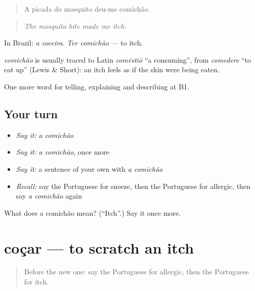 \begin{quote}
A picada do mosquito deu-me comichão.
\end{quote}

\begin{quote}
\emph{The mosquito bite made me itch.}
\end{quote}

In Brazil: \emph{a coceira}. \emph{Ter comichão} — to itch.

\begin{cousinweb}
\emph{comichão} is usually traced to Latin \emph{comēstiō} \textquotedblleft{}a consuming\textquotedblright{}, from \emph{comedere} \textquotedblleft{}to eat up\textquotedblright{} (Lewis \& Short): an itch feels as if the skin were being eaten.
\end{cousinweb}

\begin{grammarlens}[title={What you've built}]
One more word for telling, explaining and describing at B1.
\end{grammarlens}

\subsection*{Your turn}
\begin{itemize}
\raggedright
  \item \emph{Say it:} \emph{a comichão}
  \item \emph{Say it:} \emph{a comichão}, once more
  \item \emph{Say it:} a sentence of your own with \emph{a comichão}
  \item \emph{Recall:} say the Portuguese for sneeze, then the Portuguese for allergic, then say \emph{a comichão} again
\end{itemize}

\begin{tcolorbox}[breakable,colback=teal!4,colframe=teal!35!black,title={Before you move on}]
What does a comichão mean? (\textquotedblleft{}Itch\textquotedblright{}.) Say it once more.
\end{tcolorbox}
\section[coçar]{coçar — to scratch an itch}

\label{lesson:PT-C483-cocar}



\begin{quote}
Before the new one: say the Portuguese for allergic, then the Portuguese for itch.
\end{quote}

